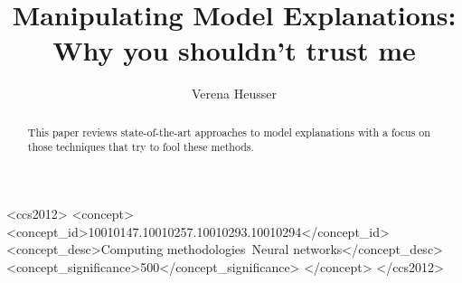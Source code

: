 \documentclass[sigconf]{acmart}
\begin{document}
\title{Manipulating Model Explanations: Why you shouldn't trust me}



\author{Verena Heusser}


\begin{abstract}
  This paper reviews state-of-the-art approaches to model explanations with a focus on those techniques that try to 
  fool these methods. 

\end{abstract}

\begin{CCSXML}
  <ccs2012>
  <concept>
  <concept_id>10010147.10010257.10010293.10010294</concept_id>
  <concept_desc>Computing methodologies~Neural networks</concept_desc>
  <concept_significance>500</concept_significance>
  </concept>
  </ccs2012>
\end{CCSXML}




\maketitle

















{}
% 


\end{document}
